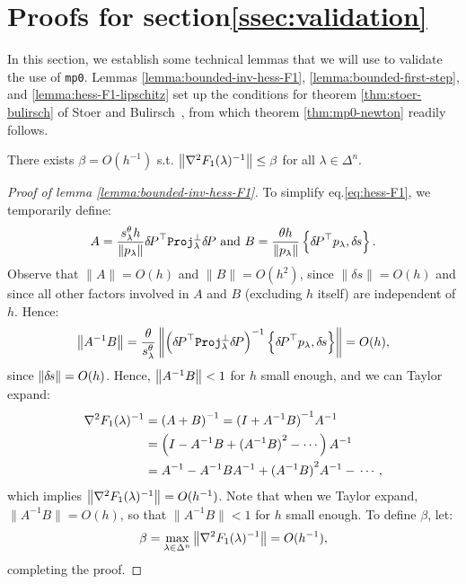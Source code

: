 \documentclass[smallcondensed]{svjour3}
\begin{document}
\section{Proofs for
  section\@ \ref{ssec:validation}}\label{app:validation-proofs} In this section, we establish some technical lemmas that we will use
to validate the use of \texttt{mp0}. Lemmas
\ref{lemma:bounded-inv-hess-F1}, \ref{lemma:bounded-first-step}, and
\ref{lemma:hess-F1-lipschitz} set up the conditions for theorem
\ref{thm:stoer-bulirsch} of Stoer and
Bulirsch~\cite{stoer2013introduction}, from which theorem
\ref{thm:mp0-newton} readily follows.

\begin{lemma}\label{lemma:bounded-inv-hess-F1}
  There exists $\beta = O(h^{-1})$ s.t.
  $\left\|\nabla^2 F_1(\lambda)^{-1}\right\| \leq \beta$ for all
  $\lambda \in \Delta^n$.
\end{lemma}

\begin{proof}[Proof of lemma \ref{lemma:bounded-inv-hess-F1}]
  To simplify eq.\@ \ref{eq:hess-F1}, we temporarily define:
  \begin{equation}
    A = \frac{s^\theta_\lambda h}{\|p_\lambda\|} {\delta \hspace{-0.14em} P}^\top \mathtt{Proj}^\perp_\lambda {\delta \hspace{-0.14em} P} \mbox{ and } B = \frac{\theta h}{\|p_\lambda\|} \left\{{\delta \hspace{-0.14em} P}^\top p_\lambda, {\delta \hspace{-0.1em} s}\right\}.
  \end{equation}
  Observe that $\|A\| = O(h)$ and $\|B\| = O(h^2)$, since
  $\|\delta s\| = O(h)$ and since all other factors involved in $A$
  and $B$ (excluding $h$ itself) are independent of $h$. Hence:
  \begin{equation}
    \left\|A^{-1} B\right\| = \frac{\theta}{s^\theta_\lambda} \left\|\left({\delta \hspace{-0.14em} P}^\top \mathtt{Proj}^\perp_\lambda {\delta \hspace{-0.14em} P}\right)^{-1} \left\{{\delta \hspace{-0.14em} P}^\top p_\lambda, {\delta \hspace{-0.1em} s}\right\}\right\| = O(h),
  \end{equation}
  since $\left\|{\delta \hspace{-0.1em} s}\right\| = O(h)$. Hence, $\left\|A^{-1} B\right\| < 1$ for $h$
  small enough, and we can Taylor expand:
  \begin{equation}
    \begin{aligned}
      \nabla^2 F_1(\lambda)^{-1} &= \left(A + B\right)^{-1} = {(I + A^{-1} B)}^{-1} A^{-1} \\
      &= \left(I - A^{-1} B + {(A^{-1} B)}^2 - \cdots\right) A^{-1} \\
      &= A^{-1} - A^{-1} B A^{-1} + {(A^{-1} B)}^2 A^{-1} - \,\cdots,
    \end{aligned}
  \end{equation}
  which implies $\left\|\nabla^2 F_1(\lambda)^{-1}\right\| = O(h^{-1})$. Note
  that when we Taylor expand, $\|A^{-1} B\| = O(h)$, so that
  $\|A^{-1} B\| < 1$ for $h$ small enough. To define $\beta$, let:
  \begin{equation}
    \beta = \max_{\lambda \in \Delta^n} \left\|\nabla^2 F_1(\lambda)^{-1}\right\| = O(h^{-1}),
  \end{equation}
  completing the proof.
\end{proof}
\end{document}
